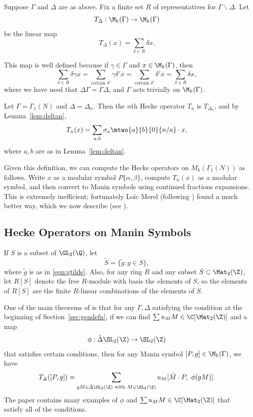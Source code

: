 Suppose $\Gamma$ and $\Delta$ are as above.    Fix
a finite set $R$ of representatives for $\Gamma\backslash \Delta$.
Let
$$
 T_{\Delta} : \M_k(\Gamma) \to \M_k(\Gamma)
$$
be the linear map
$$
  T_{\Delta}(x) = \sum_{\delta\in R} \delta x.
$$

This map is well defined because 
if $\gamma\in\Gamma$ and $x\in \M_k(\Gamma)$,
then 
$$\sum_{\delta\in R} \delta \gamma  x = 
\sum_{\text{certain $\delta'$}} \gamma \delta' x
 = \sum_{\text{certain $\delta'$}} \delta' x
 =\sum_{\delta\in R} \delta x,
$$
where we have used that $\Delta\Gamma = \Gamma\Delta$, and 
$\Gamma$ acts trivially on $\M_k(\Gamma)$.

Let $\Gamma=\Gamma_1(N)$ and $\Delta=\Delta_n$.  Then the $n$th
Hecke operator $T_n$ is $T_{\Delta_n}$, and by Lemma~\ref{lem:deltan},
$$
 T_n(x) = \sum_{a,b} \sigma_a \mtwo{a}{b}{0}{n/a} \cdot x,
$$
where $a,b$ are as in Lemma~\ref{lem:deltan}.

Given this definition, we can compute the Hecke operators on
$M_k(\Gamma_1(N))$ as follows.  Write $x$ as a modular symbol
$P\{\alpha,\beta\}$, compute $T_n(x)$ as a modular symbol,
and then convert  to Manin symbols using continued fractions
expansions.  This is extremely inefficient; fortunately Lo\"{i}c
Merel (following \cite{mazur:symboles}) found a much better way, which
we now describe (see \cite{merel:1585}).

\subsection{Hecke Operators on Manin Symbols}\label{sec:hecke_on_manin}
If $S$ is a subset of $\GL_2(\Q)$, 
let $$\tilde{S} = \{\tilde{g} : g \in  S\},$$
where $\tilde{g}$ is as in \eqref{eqn:gtilde}.
Also, for any ring $R$ and any subset $S\subset \Mat_2(\Z)$, 
let $R[S]$ denote the free $R$-module with basis the elements of $S$,
so the elements of $R[S]$ are the finite $R$-linear combinations
of the elements of $S$.

One of the main theorems of \cite{merel:1585} is that for any
$\Gamma,\Delta$ satisfying the condition at the beginning of
Section~\ref{sec:gendefn}, if we can find $\sum u_M M \in
\C[\Mat_2(\Z)]$ and a map
$$\phi: \tilde{\Delta} \SL_2(\Z) \to \SL_2(\Z)$$
that satisfies certain conditions, then for any Manin
symbol $[P,g] \in \M_k(\Gamma)$, we have 
$$ 
  T_\Delta([P,g]) =
\sum_{gM\in \tilde{\Delta}\SL_2(\Z)\text{ with }M\in\SL_2(\Z)} u_M
[\tilde{M}\cdot P,\,\, \phi(gM)].
$$ 
The paper
\cite{merel:1585} contains many examples of $\phi$ and $\sum u_M M \in
\C[\Mat_2(\Z)]$ that satisfy all of the conditions.
 
